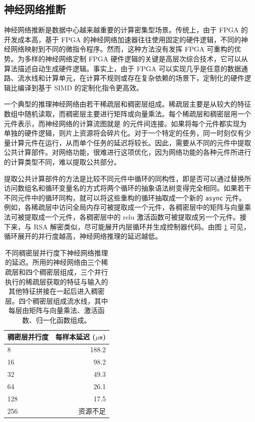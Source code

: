 \subsection{神经网络推断}

神经网络推断是数据中心越来越重要的计算密集型场景。传统上，由于 FPGA 的开发成本高，基于 FPGA 的神经网络加速器往往使用固定的硬件逻辑，不同的神经网络映射到不同的微指令程序。然而，这种方法没有发挥 FPGA 可重构的优势。为多样的神经网络定制 FPGA 硬件逻辑的关键是高层次综合技术，它可以从算法描述自动生成硬件逻辑。事实上，由于 FPGA 可以实现几乎是任意的数据通路、流水线和计算单元，在计算不规则或存在复杂依赖的场景下，定制化的硬件逻辑比编译到基于 SIMD 的定制化指令更高效。

一个典型的推理神经网络由若干稀疏层和稠密层组成。稀疏层主要是从较大的特征数组中随机读取，而稠密层主要进行矩阵或向量乘法。每个稀疏层和稠密层用一个 \name 元件表示，而神经网络的计算流图就是 \name 的元件间连接。如果将每个元件都实现为单独的硬件逻辑，则片上资源将会碎片化。对于一个特定的任务，同一时刻仅有少量计算元件在运行，从而单个任务的延迟将较长。因此，需要从不同的元件中提取公共计算部件。对网络功能，\name 很难进行这项优化，因为网络功能的各种元件所进行的计算类型不同，难以提取公共部分。

提取公共计算部件的方法是比较不同元件中循环的同构性，即是否可以通过替换所访问数组名和循环变量名的方式将两个循环的抽象语法树变得完全相同。如果若干不同元件中的循环同构，就可以将这些重构的循环抽取成一个新的 \texttt{async} 元件。例如，各稀疏层中访问全局内存可被提取成一个元件，各稠密层中的矩阵与向量乘法可被提取成一个元件，各稠密层中的 relu 激活函数可被提取成另一个元件。接下来，与 RSA 解密类似，\name 尽可能展开内层循环并生成控制器代码。由图 \ref{clicknp:tab:neural-network} 可见，循环展开的并行度越高，神经网络推理的延迟越低。

\begin{table}[htbp]
	\centering
	\caption{不同稠密层并行度下神经网络推理的延迟。所用的神经网络由三个稀疏层和四个稠密层组成，三个并行执行的稀疏层获取的特征与输入的其他特征拼接在一起后进入稠密层。四个稠密层组成流水线，其中每层由矩阵与向量乘法、激活函数、归一化函数组成。}
	\label{clicknp:tab:neural-network}
	\small
	\begin{tabular}{l|r}
		\toprule
		稠密层并行度 & 每样本延迟 ($\mu$s) \\
		\midrule
		8 & 188.2 \\
		16 & 98.2 \\
		32 & 49.3 \\
		64 & 26.1 \\
		128 & 17.5 \\
		256 & 资源不足 \\
		\bottomrule
	\end{tabular}
\end{table}

